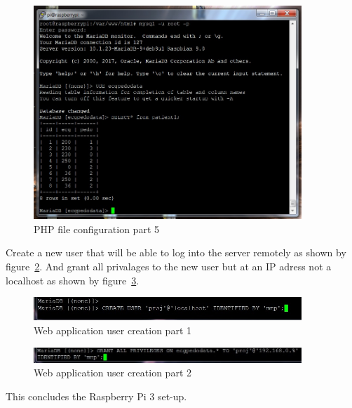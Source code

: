 \documentclass[12pt,]{article}
\begin{document}
\begin{figure}[H]
  	\begin{center}
    	\includegraphics[width=0.9\textwidth]{Ras_37}
  	\end{center}
  	\caption{PHP file configuration part 5}
	\label{fig:54}
\end{figure}
Create a new user that will be able to log into the server remotely as shown by figure~\ref{fig:55}. And grant all privalages to the new user but at an IP adress not a localhost as shown by figure~\ref{fig:56}.
\begin{figure}[H]
  	\begin{center}
    	\includegraphics[width=0.9\textwidth]{Ras_39}
  	\end{center}
  	\caption{Web application user creation part 1}
	\label{fig:55}
\end{figure}
\begin{figure}[H]
  	\begin{center}
    	\includegraphics[width=0.9\textwidth]{Ras_40}
  	\end{center}
  	\caption{Web application user creation part 2}
	\label{fig:56}
\end{figure}
This concludes the Raspberry Pi 3 set-up.
\end{document}
